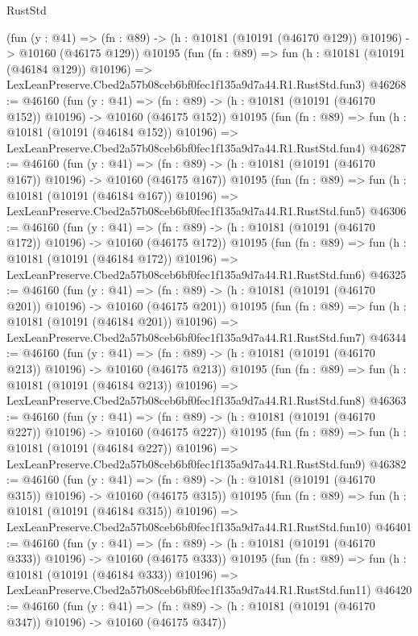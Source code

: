 \begin{lexlean}{RustStd}
\begin{coremodule}
    (fun (y : @41) =>
    (fn : @89) -> (h : @10181 (@10191 (@46170 @129)) @10196) -> @10160 (@46175 @129))
    @10195
    (fun (fn : @89) =>
    fun (h : @10181 (@10191 (@46184 @129)) @10196) =>
    LexLeanPreserve.Cbed2a57b08ceb6bf0fec1f135a9d7a44.R1.RustStd.fun3)
@46268 := @46160
    (fun (y : @41) =>
    (fn : @89) -> (h : @10181 (@10191 (@46170 @152)) @10196) -> @10160 (@46175 @152))
    @10195
    (fun (fn : @89) =>
    fun (h : @10181 (@10191 (@46184 @152)) @10196) =>
    LexLeanPreserve.Cbed2a57b08ceb6bf0fec1f135a9d7a44.R1.RustStd.fun4)
@46287 := @46160
    (fun (y : @41) =>
    (fn : @89) -> (h : @10181 (@10191 (@46170 @167)) @10196) -> @10160 (@46175 @167))
    @10195
    (fun (fn : @89) =>
    fun (h : @10181 (@10191 (@46184 @167)) @10196) =>
    LexLeanPreserve.Cbed2a57b08ceb6bf0fec1f135a9d7a44.R1.RustStd.fun5)
@46306 := @46160
    (fun (y : @41) =>
    (fn : @89) -> (h : @10181 (@10191 (@46170 @172)) @10196) -> @10160 (@46175 @172))
    @10195
    (fun (fn : @89) =>
    fun (h : @10181 (@10191 (@46184 @172)) @10196) =>
    LexLeanPreserve.Cbed2a57b08ceb6bf0fec1f135a9d7a44.R1.RustStd.fun6)
@46325 := @46160
    (fun (y : @41) =>
    (fn : @89) -> (h : @10181 (@10191 (@46170 @201)) @10196) -> @10160 (@46175 @201))
    @10195
    (fun (fn : @89) =>
    fun (h : @10181 (@10191 (@46184 @201)) @10196) =>
    LexLeanPreserve.Cbed2a57b08ceb6bf0fec1f135a9d7a44.R1.RustStd.fun7)
@46344 := @46160
    (fun (y : @41) =>
    (fn : @89) -> (h : @10181 (@10191 (@46170 @213)) @10196) -> @10160 (@46175 @213))
    @10195
    (fun (fn : @89) =>
    fun (h : @10181 (@10191 (@46184 @213)) @10196) =>
    LexLeanPreserve.Cbed2a57b08ceb6bf0fec1f135a9d7a44.R1.RustStd.fun8)
@46363 := @46160
    (fun (y : @41) =>
    (fn : @89) -> (h : @10181 (@10191 (@46170 @227)) @10196) -> @10160 (@46175 @227))
    @10195
    (fun (fn : @89) =>
    fun (h : @10181 (@10191 (@46184 @227)) @10196) =>
    LexLeanPreserve.Cbed2a57b08ceb6bf0fec1f135a9d7a44.R1.RustStd.fun9)
@46382 := @46160
    (fun (y : @41) =>
    (fn : @89) -> (h : @10181 (@10191 (@46170 @315)) @10196) -> @10160 (@46175 @315))
    @10195
    (fun (fn : @89) =>
    fun (h : @10181 (@10191 (@46184 @315)) @10196) =>
    LexLeanPreserve.Cbed2a57b08ceb6bf0fec1f135a9d7a44.R1.RustStd.fun10)
@46401 := @46160
    (fun (y : @41) =>
    (fn : @89) -> (h : @10181 (@10191 (@46170 @333)) @10196) -> @10160 (@46175 @333))
    @10195
    (fun (fn : @89) =>
    fun (h : @10181 (@10191 (@46184 @333)) @10196) =>
    LexLeanPreserve.Cbed2a57b08ceb6bf0fec1f135a9d7a44.R1.RustStd.fun11)
@46420 := @46160
    (fun (y : @41) =>
    (fn : @89) -> (h : @10181 (@10191 (@46170 @347)) @10196) -> @10160 (@46175 @347))

\end{coremodule}
\end{lexlean}
